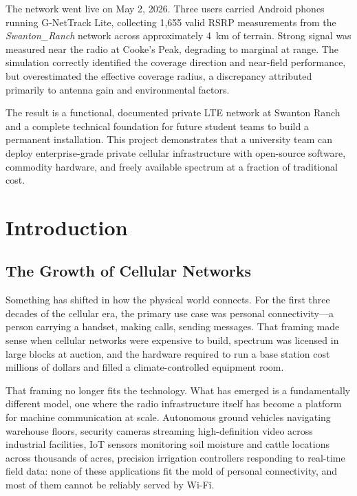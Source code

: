 \documentclass[
    left=1.5in,
    right=1.25in,
    top=1.25in,
    bottom=1.25in
]{CalPolySeniorProject}
\begin{document}
The network went live on May 2, 2026. Three users carried Android phones
running G-NetTrack Lite, collecting 1,655 valid RSRP measurements from the
\textit{Swanton\_Ranch} network across approximately 4~km of terrain. Strong
signal was measured near the radio at Cooke's Peak, degrading to marginal at
range. The simulation correctly identified the coverage direction and near-field
performance, but overestimated the effective coverage radius, a discrepancy
attributed primarily to antenna gain and environmental factors.

The result is a functional, documented private LTE network at Swanton Ranch and
a complete technical foundation for future student teams to build a permanent
installation. This project demonstrates that a university team can deploy
enterprise-grade private cellular infrastructure with open-source software,
commodity hardware, and freely available spectrum at a fraction of traditional
cost.

\clearpage
{}
\setcounter{page}{1}

\section{Introduction}

\subsection{The Growth of Cellular Networks}

Something has shifted in how the physical world connects. For the first three
decades of the cellular era, the primary use case was personal
connectivity---a person carrying a handset, making calls, sending messages.
That framing made sense when cellular networks were expensive to build, spectrum
was licensed in large blocks at auction, and the hardware required to run a base
station cost millions of dollars and filled a climate-controlled equipment room.

That framing no longer fits the technology. What has emerged is a fundamentally
different model, one where the radio infrastructure itself has become a platform
for machine communication at scale. Autonomous ground vehicles navigating
warehouse floors, security cameras streaming high-definition video across
industrial facilities, IoT sensors monitoring soil moisture and cattle locations
across thousands of acres, precision irrigation controllers responding to
real-time field data: none of these applications fit the mold of personal
connectivity, and most of them cannot be reliably served by Wi-Fi.
\end{document}
